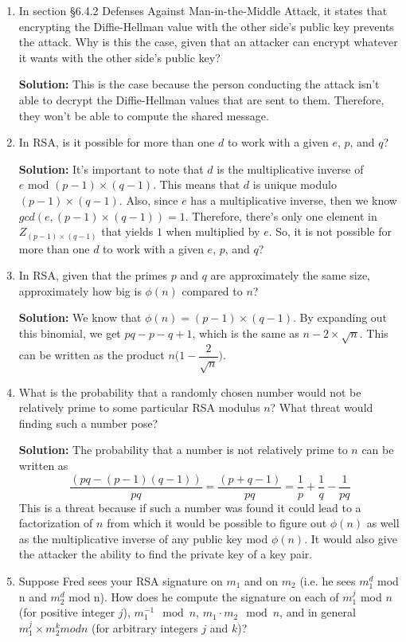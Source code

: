 \documentclass[11pt]{article}
\begin{document}
\begin{enumerate}
\item In section §6.4.2 Defenses Against Man-in-the-Middle Attack, it states that encrypting the Diffie-Hellman value with the other side's public key prevents the attack. Why is this the case, given that an attacker can encrypt whatever it wants with the other side's public key?

\textbf{Solution: }
This is the case because the person conducting the attack isn't able to decrypt the Diffie-Hellman values that are sent to them.  Therefore, they won't be able to compute the shared message.  

\item In RSA, is it possible for more than one $d$ to work with a given $e$, $p$, and $q$?

\textbf{Solution: }
It's important to note that $d$ is the multiplicative inverse of $e \text{ mod } (p-1)\times(q-1)$.  This means that $d$ is unique modulo $(p-1)\times(q-1)$.  Also, since $e$ has a multiplicative inverse, then we know $gcd(e, (p-1)\times(q-1)) = 1$.  Therefore, there's only one element in $Z_{(p-1)\times(q-1)}$ that yields $1$ when multiplied by $e$.  So, it is not possible for more than one $d$ to work with a given $e$, $p$, and $q$?

\item In RSA, given that the primes $p$ and $q$ are approximately the same size, approximately how big is $\phi(n)$ compared to $n$?

\textbf{Solution: }
We know that $\phi(n) = (p-1)\times(q-1)$.  By expanding out this binomial, we get $pq - p - q + 1$, which is the same as $n - 2 \times \sqrt{n}$.  This can be written as the product $n\bigg(1 - \dfrac{2}{\sqrt{n}}\bigg)$.  

\item What is the probability that a randomly chosen number would not be relatively prime to some particular RSA modulus $n$?  What threat would finding such a number pose?

\textbf{Solution: }
The probability that a number is not relatively prime to $n$ can be written as
$$ \frac{(pq - (p - 1)(q - 1))}{pq} = \frac{(p + q - 1)}{pq} = \frac{1}{p} + \frac{1}{q} - \frac{1}{pq} $$
This is a threat because if such a number was found it could lead to a factorization of $n$ from which it would be possible to figure out $\phi(n)$ as well as the multiplicative inverse of any public key mod $\phi(n)$.  It would also give the attacker the ability to find the private key of a key pair.  

\item Suppose Fred sees your RSA signature on $m_1$ and on $m_2$ (i.e. he sees $m_1^d$ mod n and $m_2^d$ mod n). How does he compute the signature on each of $m_1^j$ mod $n$ (for positive integer $j$), $m_1^{-1} \mod n$, $m_1·m_2 \mod n$, and in general $m_1^j \times m_2^k mod n$ (for arbitrary integers $j$ and $k$)?


\end{enumerate}
\end{document}
